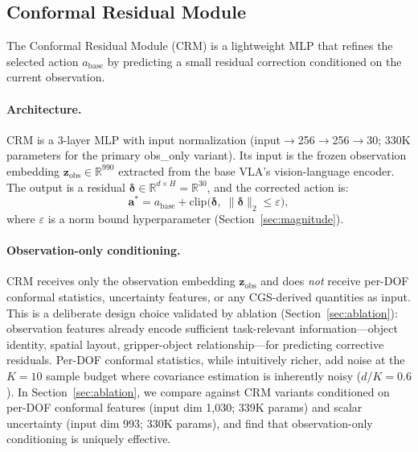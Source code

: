 \subsection{Conformal Residual Module}
\label{sec:crm}

The Conformal Residual Module (CRM) is a lightweight MLP that refines the selected action $a_{\mathrm{base}}$ by predicting a small residual correction conditioned on the current observation.

\paragraph{Architecture.}
CRM is a 3-layer MLP with input normalization (input$\to$256$\to$256$\to$30; 330K parameters for the primary obs\_only variant).
Its input is the frozen observation embedding $\mathbf{z}_{\mathrm{obs}} \in \mathbb{R}^{990}$ extracted from the base VLA's vision-language encoder. The output is a residual $\boldsymbol{\delta} \in \mathbb{R}^{d \times H} = \mathbb{R}^{30}$, and the corrected action is:
\begin{equation}
  \mathbf{a}^* = a_{\mathrm{base}} + \mathrm{clip}\bigl(\boldsymbol{\delta},\; \|\boldsymbol{\delta}\|_2 \leq \varepsilon\bigr),
  \label{eq:crm}
\end{equation}
where $\varepsilon$ is a norm bound hyperparameter (Section~\ref{sec:magnitude}).

\paragraph{Observation-only conditioning.}
CRM receives only the observation embedding $\mathbf{z}_{\mathrm{obs}}$ and does \emph{not} receive per-DOF conformal statistics, uncertainty features, or any CGS-derived quantities as input. This is a deliberate design choice validated by ablation (Section~\ref{sec:ablation}): observation features already encode sufficient task-relevant information---object identity, spatial layout, gripper-object relationship---for predicting corrective residuals. Per-DOF conformal statistics, while intuitively richer, add noise at the $K{=}10$ sample budget where covariance estimation is inherently noisy ($d/K = 0.6$). In Section~\ref{sec:ablation}, we compare against CRM variants conditioned on per-DOF conformal features (input dim 1{,}030; 339K params) and scalar uncertainty (input dim 993; 330K params), and find that observation-only conditioning is uniquely effective.

